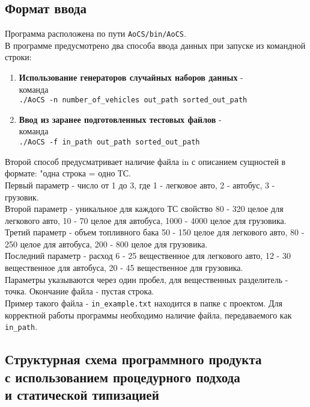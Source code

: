 \documentclass[a4paper]{article}
\begin{document}
\subsection*{Формат ввода}
Программа расположена по пути \verb|AoCS/bin/AoCS|.\\
В программе предусмотрено два способа ввода данных при запуске из командной строки:
\begin{enumerate} 
    \item \textbf{Использование генераторов случайных наборов данных} - \\команда \\\verb|./AoCS -n number_of_vehicles out_path sorted_out_path|
    
    \item \textbf{Ввод из заранее подготовленных тестовых
    файлов} - \\команда \\\verb|./AoCS -f in_path out_path sorted_out_path|
\end{enumerate}

Второй способ предусматривает наличие файла in с описанием сущностей в формате:
"одна строка = одно ТС.\\
Первый параметр - число от 1 до 3, где 1 - легковое авто, 2 - автобус, 3 - грузовик.\\
Второй параметр - уникальное для каждого ТС свойство
80 - 320 целое для легкового авто, 10 - 70 целое для автобуса, 1000 - 4000 целое для грузовика.\\
Третий параметр - объем топливного бака
50 - 150 целое для легкового авто, 80 - 250 целое для автобуса, 200 - 800 целое для грузовика.\\
Последний параметр - расход
6 - 25 вещественное для легкового авто, 12 - 30 вещественное для автобуса, 20 - 45 вещественное для грузовика.\\
Параметры указываются через один пробел, для вещественных разделитель - точка. Окончание файла - пустая строка.\\
Пример такого файла - \verb|in_example.txt| находится в папке с проектом. Для корректной работы программы необходимо наличие файла, передаваемого как \verb|in_path|.
\newpage
\begin{center}

\section*{Структурная схема программного продукта\\с использованием процедурного подхода\\ и статической типизацией}
\end{center}
\end{document}
